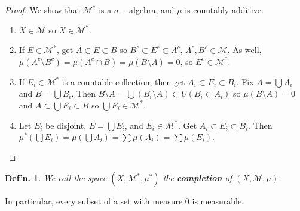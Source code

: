 \documentclass[12pt, a4paper]{book}
\newtheorem{definition}[theorem]{Def'n.}
\theoremstyle{nonumberplain}
\newtheorem{proof}{Proof}
\begin{document}
\begin{proof}
    We show that $\mathcal{M}^*$ is a $\sigma-$algebra, and $\mu$ is countably additive.
    \begin{enumerate}[nolistsep]
        \item $X\in\mathcal{M}$ so $X\in\mathcal{M}^*$.
        \item If $E\in\mathcal{M}^*$, get $A\subset E\subset B$ so $B^c\subset E^c\subset A^c$, $A^c,B^c\in\mathcal{M}$.
            As well, $\mu(A^c\setminus B^c)=\mu(A^c\cap B)=\mu(B\setminus A)=0$, so $E^c\in\mathcal{M}^*$.
        \item If $E_i\in\mathcal{M}^*$ is a countable collection, then get $A_i\subset E_i\subset B_i$.
            Fix $A=\bigcup A_i$ and $B=\bigcup B_i$.
            Then $B\setminus A=\bigcup(B_i\setminus A)\subset U(B_i\subset A_i)$ so $\mu(B\setminus A)=0$ and $A\subset\bigcup E_i\subset B$ so $\bigcup E_i\in\mathcal{M}^*$.
        \item Let $E_i$ be disjoint, $E=\bigcup E_i$, and $E_i\in\mathcal{M}^*$.
            Get $A_i\subset E_i\subset B_i$.
            Then $\mu^*(\bigcup E_i)=\mu(\bigcup A_i)=\sum\mu(A_i)=\sum\mu(E_i)$.
    \end{enumerate}
\end{proof}
\begin{definition}
    We call the space $(X,\mathcal{M}^*,\mu^*)$ the \textbf{completion} of $(X,\mathcal{M},\mu)$.
\end{definition}
In particular, every subset of a set with measure $0$ is measurable.
\end{document}
